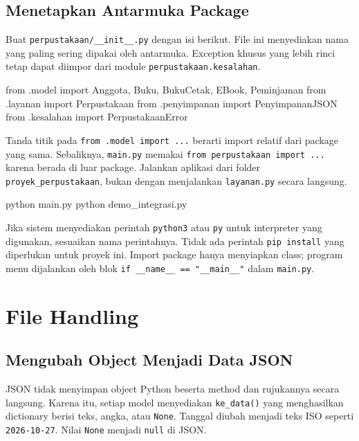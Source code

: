 \subsection{Menetapkan Antarmuka Package}

Buat \texttt{perpustakaan/\_\_init\_\_.py} dengan isi berikut. File ini menyediakan nama yang paling sering dipakai oleh antarmuka. Exception khusus yang lebih rinci tetap dapat diimpor dari module \texttt{perpustakaan.kesalahan}.

\begin{kode}
from .model import Anggota, Buku, BukuCetak, EBook, Peminjaman
from .layanan import Perpustakaan
from .penyimpanan import PenyimpananJSON
from .kesalahan import PerpustakaanError
\end{kode}

Tanda titik pada \texttt{from .model import ...} berarti import relatif dari package yang sama. Sebaliknya, \texttt{main.py} memakai \texttt{from perpustakaan import ...} karena berada di luar package. Jalankan aplikasi dari folder \texttt{proyek\_perpustakaan}, bukan dengan menjalankan \texttt{layanan.py} secara langsung.

\begin{keluaran}
python main.py
python demo_integrasi.py
\end{keluaran}

Jika sistem menyediakan perintah \texttt{python3} atau \texttt{py} untuk interpreter yang digunakan, sesuaikan nama perintahnya. Tidak ada perintah \texttt{pip install} yang diperlukan untuk proyek ini. Import package hanya menyiapkan class; program menu dijalankan oleh blok \texttt{if \_\_name\_\_ == "\_\_main\_\_"} dalam \texttt{main.py}.

\section{File Handling}

\subsection{Mengubah Object Menjadi Data JSON}

JSON tidak menyimpan object Python beserta method dan rujukannya secara langsung. Karena itu, setiap model menyediakan \texttt{ke\_data()} yang menghasilkan dictionary berisi teks, angka, atau \texttt{None}. Tanggal diubah menjadi teks ISO seperti \texttt{2026-10-27}. Nilai \texttt{None} menjadi \texttt{null} di JSON.

